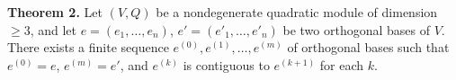 \textbf{Theorem 2.} Let $(V,Q)$ be a nondegenerate quadratic module of dimension $\ge 3$, and let $e = (e_1, \dots, e_n)$, $e' = (e'_1, \dots, e'_n)$ be two orthogonal bases of $V$. There exists a finite sequence $e^{(0)}, e^{(1)}, \dots, e^{(m)}$ of orthogonal bases such that $e^{(0)} = e$, $e^{(m)} = e'$, and $e^{(k)}$ is contiguous to $e^{(k+1)}$ for each $k$.
